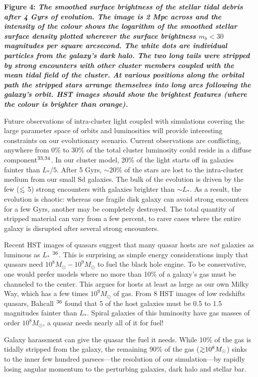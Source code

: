 \oneskip
{\bf Figure 4: \em The smoothed surface brightness of the stellar
tidal debris after 4 Gyrs of evolution. The image is 2 Mpc across and
the intensity of the colour shows the logarithm of the smoothed
stellar surface density plotted wherever the surface brightness
$m_b<30$ magnitudes per square arcsecond. The white dots are
individual particles from the galaxy's dark halo.  The two long tails
were stripped by strong encounters with other cluster members coupled
with the mean tidal field of the cluster.  At various positions along
the orbital path the stripped stars arrange themselves into long arcs
following the galaxy's orbit.  HST images should show the brightest
features (where the colour is brighter than orange).}
\oneskip

Future observations of intra-cluster light coupled with simulations
covering the large parameter space of orbits and luminosities will
provide interesting constraints on our evolutionary scenario.  Current
observations are conflicting, anywhere from 0\% to 30\% of the total
cluster luminosity could reside in a diffuse component$^{\bf\rm
33,34}$.  In our cluster model, 20\% of the light starts off in
galaxies fainter than $L_*/5$.  After 5 Gyrs, $\sim$20\% of the stars
are lost to the intra-cluster medium from our small Sd galaxies.  The
bulk of the evolution is driven by the few ($\lsim$ 5) strong
encounters with galaxies brighter than $\sim L_*$.  As a result, the
evolution is chaotic: whereas one fragile disk galaxy can avoid strong
encounters for a few Gyrs, another may be completely destroyed.  The
total quantity of stripped material can vary from a few percent, to
rarer cases where the entire galaxy is disrupted after several strong
encounters.

Recent HST images of quasars suggest that many quasar hosts are {\it
not} galaxies as luminous as $L_*$ $^{\bf\rm 36}$.  This is surprising
as simple energy considerations imply that quasars need $10^8M_\odot -
10^9M_\odot$ to fuel the black hole engine.  To be conservative, one
would prefer models where no more than 10\% of a galaxy's gas must be
channeled to the center.  This argues for hosts at least as large as
our own Milky Way, which has a few times $10^9M_\odot$ of gas.  From 8
HST images of low redshifts quasars, Bahcall \etal$^{\bf\rm 36}$ found that
5 of the host galaxies must be 0.5 to 1.5 magnitudes fainter than
$L_*$.  Spiral galaxies of this luminosity have gas masses of order
$10^8M_\odot$, a quasar needs nearly all of it for fuel!

Galaxy harassment can give the quasar the fuel it needs.  While 10\%
of the gas is tidally stripped from the galaxy, the remaining 90\% of
the gas ($\gsim 10^8M_\odot$) sinks to the inner few hundred parsecs---the
resolution of our simulation---by rapidly losing angular momentum to
the perturbing galaxies, dark halo and stellar bar.

